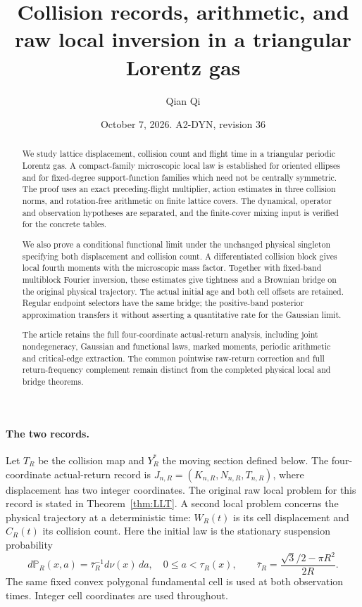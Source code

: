\documentclass[11pt,reqno]{amsart}
\title[Collision records and raw local inversion]{Collision records, arithmetic, and raw local inversion in a triangular Lorentz gas}
\author{Qian Qi}
\date{October 7, 2026. A2-DYN, revision 36}
\numberwithin{equation}{section}
\theoremstyle{definition}\newtheorem{definition}[theorem]{Definition}
\theoremstyle{remark}\newtheorem{remark}[theorem]{Remark}
\begin{document}
\raggedbottom
\begin{abstract}
We study lattice displacement, collision count and flight time in a
triangular periodic Lorentz gas. A compact-family microscopic local law
is established for oriented ellipses and for fixed-degree support-function
families which need not be centrally symmetric. The proof uses an exact
preceding-flight multiplier, action estimates in three collision norms,
and rotation-free arithmetic on finite lattice covers. The dynamical,
operator and observation hypotheses are separated, and the finite-cover
mixing input is verified for the concrete tables.

We also prove a conditional functional limit under the unchanged
physical singleton specifying both displacement and collision count.
A differentiated collision block gives local fourth moments with the
microscopic mass factor. Together with fixed-band multiblock Fourier
inversion, these estimates give tightness and a Brownian bridge on the
original physical trajectory. The actual initial age and both cell
offsets are retained. Regular endpoint selectors have the same bridge;
the positive-band posterior approximation transfers it without asserting
a quantitative rate for the Gaussian limit.

The article retains the full four-coordinate actual-return analysis,
including joint nondegeneracy, Gaussian and functional laws, marked
moments, periodic arithmetic and critical-edge extraction. The common
pointwise raw-return correction and full return-frequency complement
remain distinct from the completed physical local and bridge theorems.
\end{abstract}
\maketitle
\enlargethispage{3pt}

\paragraph{The two records.}
Let $T_R$ be the collision map and $Y_R^*$ the moving section defined
below. The four-coordinate actual-return record is
$J_{n,R}=(K_{n,R},N_{n,R},T_{n,R})$, where displacement has two integer
coordinates. The original raw local problem for this record is stated
in Theorem~\ref{thm:LLT}. A second local problem concerns the physical
trajectory at a deterministic time: $W_R(t)$ is its cell displacement
and $C_R(t)$ its collision count. Here the initial law is the stationary
suspension probability
\[
 d\mathbb P_R(x,a)=\bar\tau_R^{-1}d\nu(x)\,da,
 \quad 0\le a<\tau_R(x),\qquad
 \bar\tau_R=\frac{\sqrt3/2-\pi R^2}{2R}.
\]
The same fixed convex polygonal fundamental cell is used at both
observation times. Integer cell coordinates are used throughout.
\end{document}
